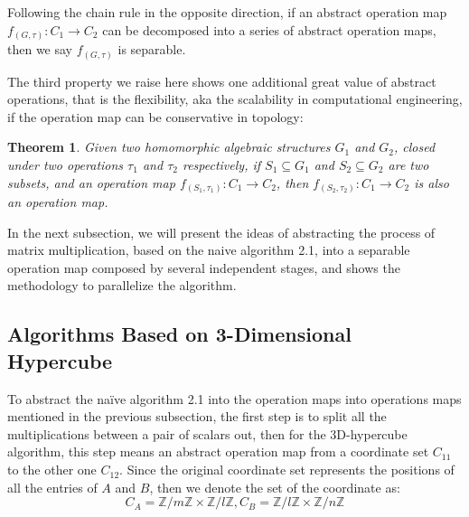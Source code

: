 \documentclass{amsart}
\newtheorem{theorem}{Theorem}[section]
\theoremstyle{definition}
\theoremstyle{remark}
\numberwithin{equation}{section}
\begin{document}
Following the chain rule in the opposite direction, if an abstract operation map $f_(G,\tau):C_1\to C_2$ can be decomposed into a series of abstract operation maps, then we say $f_(G,\tau)$ is separable.\par
The third property we raise here shows one additional great value of abstract operations, that is the flexibility, aka the scalability in computational engineering, if the operation map can be conservative in topology:
\begin{theorem}
Given two homomorphic algebraic structures $G_1$ and $G_2$, closed under two operations $\tau_1$ and $\tau_2$ respectively, if $S_1\subseteq G_1$ and $S_2\subseteq G_2$ are two subsets, and an operation map $f_(S_1,\tau_1):C_1\to C_2$, then $f_(S_2,\tau_2):C_1\to C_2$ is also an operation map.
\end{theorem}
In the next subsection, we will present the ideas of abstracting the process of matrix multiplication, based on the naive algorithm 2.1, into a separable operation map composed by several independent stages, and shows the methodology to parallelize the algorithm.\\



\subsection{Algorithms Based on 3-Dimensional Hypercube}
	To abstract the naïve algorithm 2.1 into the operation maps into operations maps mentioned in the previous subsection, the first step is to split all the multiplications between a pair of scalars out, then for the 3D-hypercube algorithm, this step means an abstract operation map from a coordinate set $C_{11}$ to the other one $C_{12}$. Since the original coordinate set represents the positions of all the entries of $A$ and $B$, then we denote the set of the coordinate as:
\begin{equation}
C_A=\mathbb{Z}/{m\mathbb{Z}}\times \mathbb{Z}/{l\mathbb{Z}},
C_B=\mathbb{Z}/{l\mathbb{Z}}\times \mathbb{Z}/{n\mathbb{Z}}
\end{equation}
\end{document}
